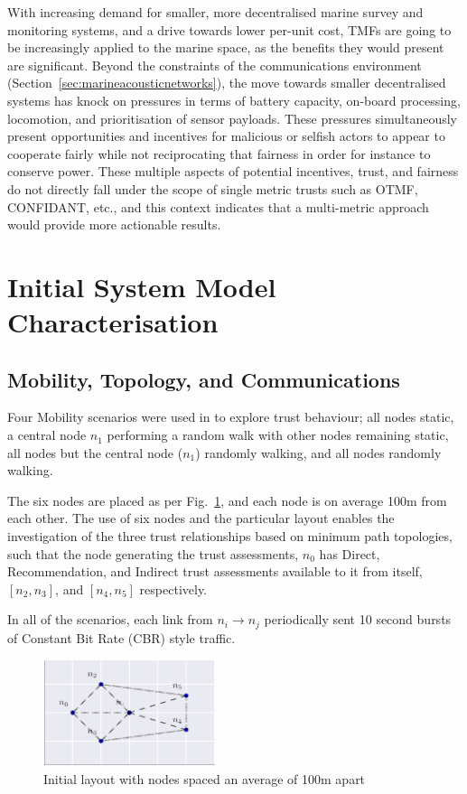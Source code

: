 \documentclass[runningheads,a4paper]{llncs}
\begin{document}
With increasing demand for smaller, more decentralised marine survey and monitoring systems, and a drive towards lower per-unit cost, TMFs are going to be increasingly applied to the marine space, as the benefits they would present are significant.
Beyond the constraints of the communications environment (Section~\ref{sec:marineacousticnetworks}), the move towards smaller decentralised systems has knock on pressures in terms of battery capacity, on-board processing, locomotion, and prioritisation of sensor payloads.
These pressures simultaneously present opportunities and incentives for malicious or selfish actors to appear to cooperate fairly while not reciprocating that fairness in order for instance to conserve power.
These multiple aspects of potential incentives, trust, and fairness do not directly fall under the scope of single metric trusts such as OTMF, CONFIDANT, etc., and this context indicates that a multi-metric approach would provide more actionable results.



\section{Initial System Model Characterisation}\label{sec:initialsystemcharacterisation}

\subsection{Mobility, Topology, and Communications}

Four Mobility scenarios were used in \cite{Guo11} to explore trust behaviour; all nodes static, a central node $n_1$ performing a random walk with other nodes remaining static, all nodes but the central node ($n_1$) randomly walking, and all nodes randomly walking.

The six nodes are placed as per Fig.~\ref{fig:s1_layout}, and each node is on average 100m from each other.
The use of six nodes and the particular layout enables the investigation of the three trust relationships based on minimum path topologies, such that the node generating the trust assessments, $n_0$ has Direct, Recommendation, and Indirect trust assessments available to it from itself, $[n_2,n_3]$, and $[n_4,n_5]$ respectively.

In all of the scenarios, each link from $n_i \rightarrow n_j$ periodically sent 10 second bursts of Constant Bit Rate (CBR) style traffic.

\begin{figure}[h]
  \centering
  \includegraphics[width=0.45\textwidth]{img/s1_layout.pdf}
  \caption{Initial layout with nodes spaced an average of 100m apart}
  \label{fig:s1_layout}
\end{figure}
\end{document}
